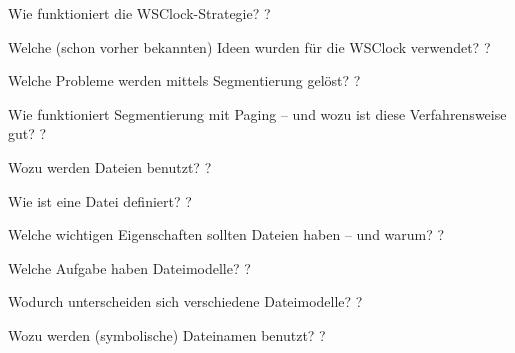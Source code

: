 \documentclass[avery5371]{flashcards}
\begin{document}
\begin{flashcard}[Speichermanagement]{Wie funktioniert die WSClock-Strategie?}
    ?
\end{flashcard}

\begin{flashcard}[Speichermanagement]{Welche (schon vorher bekannten) Ideen wurden für die WSClock verwendet? }
    ?
\end{flashcard}

\begin{flashcard}[Speichermanagement]{Welche Probleme werden mittels Segmentierung gelöst?}
    ?
\end{flashcard}

\begin{flashcard}[Speichermanagement]{Wie funktioniert Segmentierung mit Paging – und wozu ist diese Verfahrensweise gut?}
    ?
\end{flashcard}

\begin{flashcard}[Dateisysteme]{Wozu werden Dateien benutzt?}
    ?
\end{flashcard}

\begin{flashcard}[Dateisysteme]{Wie ist eine Datei definiert? }
    ?
\end{flashcard}

\begin{flashcard}[Dateisysteme]{Welche wichtigen Eigenschaften sollten Dateien haben – und warum?}
    ?
\end{flashcard}

\begin{flashcard}[Dateisysteme]{Welche Aufgabe haben Dateimodelle?}
    ?
\end{flashcard}

\begin{flashcard}[Dateisysteme]{Wodurch unterscheiden sich verschiedene Dateimodelle? }
    ?
\end{flashcard}

\begin{flashcard}[Dateisysteme]{Wozu werden (symbolische) Dateinamen benutzt?}
    ?
\end{flashcard}
\end{document}
